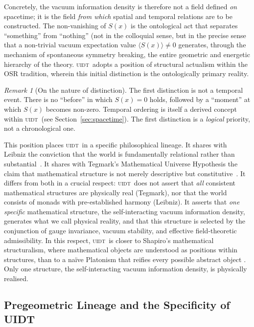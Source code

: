 \documentclass[12pt,a4paper,twoside]{article}
\theoremstyle{plain}
\theoremstyle{definition}
\theoremstyle{remark}
\newtheorem{remark}[theorem]{Remark}
\newcommand{\UIDT}{\textsc{uidt}}
\newcommand{\Sx}{S(x)}
\begin{document}
Concretely, the vacuum information density is therefore not a field defined
\emph{on} spacetime; it is the field \emph{from which} spatial and temporal
relations are to be constructed. The non-vanishing of $\Sx$ is the ontological
act that separates ``something'' from ``nothing'' (not in the colloquial sense,
but in the precise sense that a non-trivial vacuum expectation value
$\langle \Sx \rangle \neq 0$ generates, through the mechanism of spontaneous
symmetry breaking, the entire geometric and energetic hierarchy of the theory.
\UIDT\ adopts a position of structural actualism within the OSR tradition,
wherein this initial distinction is the ontologically primary reality.

\begin{remark}[On the nature of distinction]
The first distinction is not a temporal event. There is no ``before'' in which
$\Sx = 0$ holds, followed by a ``moment'' at which $\Sx$ becomes non-zero.
Temporal ordering is itself a derived concept within \UIDT\ (see
Section~\ref{sec:spacetime}). The first distinction is a \emph{logical}
priority, not a chronological one.
\end{remark}

This position places \UIDT\ in a specific philosophical lineage. It shares with
Leibniz the conviction that the world is fundamentally relational rather than
substantial~\cite{Leibniz1714}. It shares with Tegmark's Mathematical Universe
Hypothesis the claim that mathematical structure is not merely descriptive but
constitutive~\cite{Tegmark2008}. It differs from both in a crucial respect:
\UIDT\ does not assert that \emph{all} consistent mathematical structures are
physically real (Tegmark), nor that the world consists of monads with
pre-established harmony (Leibniz). It asserts that \emph{one specific}
mathematical structure, the self-interacting vacuum information density,
generates what we call physical reality, and that this structure is selected by
the conjunction of gauge invariance, vacuum stability, and effective field-theoretic admissibility.
In this respect, \UIDT\ is closer to Shapiro's mathematical structuralism,
where mathematical objects are understood as positions within structures, than
to a na\"ive Platonism that reifies every possible abstract object
\cite{Shapiro1997}. Only one structure, the self-interacting vacuum
information density, is physically realised.

\subsection{Pregeometric Lineage and the Specificity of UIDT}
\label{subsec:pregeometric-lineage}
\end{document}
